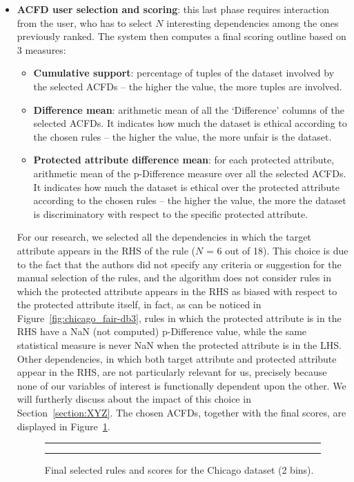 \begin{itemize}
\item \textbf{ACFD user selection and scoring}: this last phase requires interaction from the user, who has to select \(N\) interesting dependencies among the ones previously ranked. The system then computes a final scoring outline based on 3 measures:
\begin{itemize}
\item \textbf{Cumulative support}: percentage of tuples of the dataset involved by the selected ACFDs -- the higher the value, the more tuples are involved.
\item \textbf{Difference mean}: arithmetic mean of all the `Difference' columns of the selected ACFDs. It indicates how much the dataset is ethical according to the chosen rules -- the higher the value, the more unfair is the dataset.
\item \textbf{Protected attribute difference mean}: for each protected attribute, arithmetic mean of the p-Difference measure over all the selected ACFDs. It indicates how much the dataset is ethical over the protected attribute according to the chosen rules -- the higher the value, the more the dataset is discriminatory with respect to the specific protected attribute.
\end{itemize}

For our research, we selected all the dependencies in which the target attribute appears in the RHS of the rule (\(N\) = 6 out of 18). This choice is due to the fact that the authors did not specify any criteria or suggestion for the manual selection of the rules, and the algorithm does not consider rules in which the protected attribute appears in the RHS as biased with respect to the protected attribute itself, in fact, as can be noticed in Figure~\ref{fig:chicago_fair-db3}, rules in which the protected attribute is in the RHS have a NaN (not computed) p-Difference value, while the same statistical measure is never NaN when the protected attribute is in the LHS. Other dependencies, in which both target attribute and protected attribute appear in the RHS, are not particularly relevant for us, precisely because none of our variables of interest is functionally dependent upon the other. We will furtherly discuss about the impact of this choice in Section~\ref{section:XYZ}. The chosen ACFDs, together with the final scores, are displayed in Figure~\ref{fig:chicago_fair-db4}.

\begin{figure}[t!]
\centering
\noindent\rule{\linewidth}{0.4pt}\par
\noindent\rule{\linewidth}{0.4pt}
\caption{Final selected rules and scores for the Chicago dataset (2 bins).}
\label{fig:chicago_fair-db4}
\end{figure}
\end{itemize}

